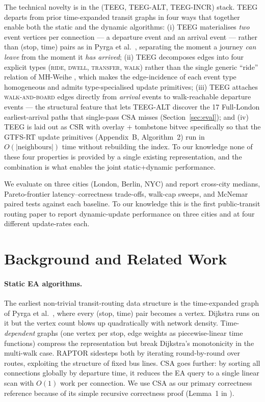 \documentclass[letterpaper]{article}
\theoremstyle{definition}
\theoremstyle{plain}
\begin{document}
The technical novelty is in the (TEEG, TEEG-ALT, TEEG-INCR) stack.
TEEG departs from prior time-expanded transit graphs in four ways
that together enable both the static and the dynamic algorithms:
(i) TEEG materialises \emph{two} event vertices per connection ---
a departure event and an arrival event --- rather than (stop, time)
pairs as in Pyrga et al.\ \cite{pyrga2008}, separating the moment a
journey \emph{can leave} from the moment it \emph{has arrived};
(ii) TEEG decomposes edges into four explicit types (\textsc{ride},
\textsc{dwell}, \textsc{transfer}, \textsc{walk}) rather than the
single generic ``ride'' relation of MH-Weihe \cite{mh2001}, which
makes the edge-incidence of each event type homogeneous and admits
type-specialised update primitives;
(iii) TEEG attaches \textsc{walk-and-board} edges directly from
\emph{arrival} events to walk-reachable departure events ---
the structural feature that lets TEEG-ALT discover the 17
Full-London earliest-arrival paths that single-pass CSA misses
(Section~\ref{sec:eval}); and
(iv) TEEG is laid out as CSR with overlay $+$ tombstone bitvec
specifically so that the GTFS-RT update primitives (Appendix~B,
Algorithm~2) run in $O(|\text{neighbours}|)$
time without rebuilding the index. To our knowledge none of these
four properties is provided by a single existing representation,
and the combination is what enables the joint static+dynamic
performance.

We evaluate on three cities (London, Berlin, NYC) and report cross-city
medians, Pareto-frontier latency--correctness trade-offs, walk-cap sweeps, and
McNemar paired tests against each baseline. To our knowledge this is the first
public-transit routing paper to report dynamic-update performance on
three cities and at four different update-rates each.

\section{Background and Related Work}

\paragraph{Static EA algorithms.}
The earliest non-trivial transit-routing data structure is the time-expanded
graph of Pyrga et al.\ \cite{pyrga2008}, where every (stop, time) pair becomes
a vertex. Dijkstra runs on it but the vertex count blows up quadratically with
network density. Time-\emph{dependent} graphs (one vertex per stop, edge
weights as piecewise-linear time functions) compress the representation but
break Dijkstra's monotonicity in the multi-walk case.
RAPTOR \cite{delling2015raptor} sidesteps both by iterating round-by-round
over routes, exploiting the structure of fixed bus lines. CSA
\cite{dibbelt2018csa} goes further: by sorting all connections globally by
departure time, it reduces the EA query to a single linear scan with $O(1)$
work per connection. We use CSA as our primary correctness reference because
of its simple recursive correctness proof (Lemma~1 in \cite{dibbelt2018csa}).
\end{document}
